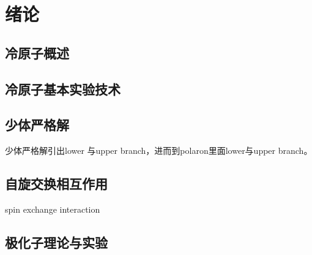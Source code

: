 \chapter{绪论}\label{chap:kondo}

\section{冷原子概述}


\section{冷原子基本实验技术}


\section{少体严格解}\label{sec:fewbody}
少体严格解引出lower 与upper branch，进而到polaron里面lower与upper branch。

\section{自旋交换相互作用}\label{sec:spin-exchange}
spin exchange interaction

\section{极化子理论与实验}


